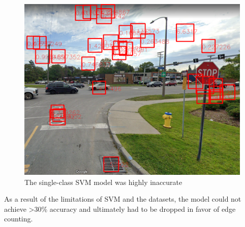 \begin{figure}[H]
  \centering
  \includegraphics[scale=.3]{figures/badML.png}
  \caption{The single-class SVM model was highly inaccurate}
\end{figure}

As a result of the limitations of SVM and the datasets, the model could not achieve >30\% accuracy and ultimately had to be dropped in favor of edge counting.
